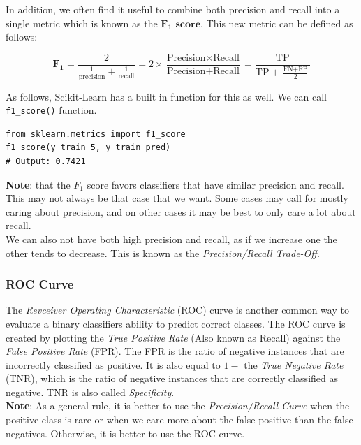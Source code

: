 \noindent
In addition, we often find it useful to combine both precision and recall into a single metric which is 
known as the $\mathbf{F_{1} \textbf{ score}}$. This new metric can be defined as follows:

$$\mathbf{F_{1}} = \frac{2}{\frac{1}{\text{precision}} + \frac{1}{\text{recall}}} = 2 \times \frac{\text{Precision} \times \text{Recall}}{{\text{Precision}} + \text{Recall}} = \frac{\text{TP}}{\text{TP} + \frac{\text{FN} + \text{FP}}{2}}$$

\noindent
As follows, Scikit-Learn has a built in function for this as well. We can call \texttt{f1_score()}
function.

\begin{verbatim}
from sklearn.metrics import f1_score
f1_score(y_train_5, y_train_pred)
# Output: 0.7421    
\end{verbatim}

\noindent
\textbf{Note}: that the $F_{1}$ score favors classifiers that have similar precision and recall. This may not 
always be that case that we want. Some cases may call for mostly caring about precision, and on other cases it 
may be best to only care a lot about recall. \\

\noindent
We can also not have both high precision and recall, as if we increase one the other tends to decrease. This is known
as the \textit{Precision/Recall Trade-Off}.

\subsubsection{ROC Curve}

The \textit{Revceiver Operating Characteristic} (ROC) curve is another common way to evaluate a binary classifiers
ability to predict correct classes. The ROC curve is created by plotting the \textit{True Positive Rate} (Also 
known as Recall) against the \textit{False Positive Rate} (FPR). The FPR is the ratio of negative instances that are
incorrectly classified as positive. It is also equal to $1 -$ the \textit{True Negative Rate} (TNR), which is the 
ratio of negative instances that are correctly classified as negative. TNR is also called \textit{Specificity}. \\

\noindent 
\textbf{Note}: As a general rule, it is better to use the \textit{Precision/Recall Curve} when the positive class is
rare or when we care more about the false positive than the false negatives. Otherwise, it is better to use the ROC
curve. 

